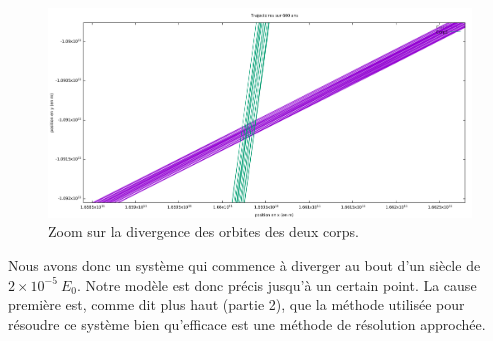 \documentclass[a4paper]{article}
\begin{document}
\begin{figure}[h]
\centering
\includegraphics[width=\textwidth]{3.png}
\caption{Zoom sur la divergence des orbites des deux corps.}
\end{figure}

Nous avons donc un système qui commence à diverger au bout d'un siècle de $2 \times 10^{-5}~E_0$. Notre modèle est donc précis jusqu'à un certain point. La cause première est, comme dit plus haut (partie 2), que la méthode utilisée pour résoudre ce système bien qu'efficace est une méthode de résolution approchée.
\end{document}
